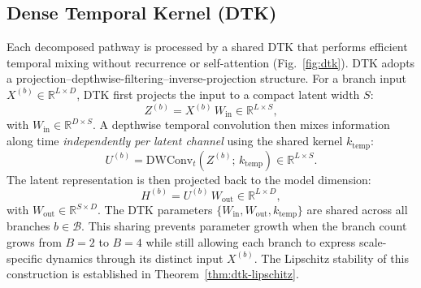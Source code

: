 \documentclass[journal]{IEEEtran}
\theoremstyle{remark}
\begin{document}
\subsection{Dense Temporal Kernel (DTK)}
Each decomposed pathway is processed by a shared DTK that performs
efficient temporal mixing without recurrence or self-attention
(Fig.~\ref{fig:dtk}). DTK adopts a
projection--depthwise-filtering--inverse-projection structure. For a
branch input $X^{(b)} \in \mathbb{R}^{L \times D}$, DTK first
projects the input to a compact latent width $S$:
\begin{equation}
\label{eq:dtk-zin}
Z^{(b)} = X^{(b)}\, W_{\mathrm{in}} \in \mathbb{R}^{L \times S},
\end{equation}
with $W_{\mathrm{in}} \in \mathbb{R}^{D \times S}$. A depthwise
temporal convolution then mixes information along time
\emph{independently per latent channel} using the shared kernel
$k_{\mathrm{temp}}$:
\begin{equation}
\label{eq:dtk-dwconv}
U^{(b)} = \mathrm{DWConv}_t(Z^{(b)};\, k_{\mathrm{temp}})
       \in \mathbb{R}^{L \times S}.
\end{equation}
The latent representation is then projected back to the model
dimension:
\begin{equation}
\label{eq:dtk-hout}
H^{(b)} = U^{(b)}\, W_{\mathrm{out}} \in \mathbb{R}^{L \times D},
\end{equation}
with $W_{\mathrm{out}} \in \mathbb{R}^{S \times D}$. The DTK
parameters $\{W_{\mathrm{in}}, W_{\mathrm{out}}, k_{\mathrm{temp}}\}$
are shared across all branches $b \in \mathcal{B}$. This sharing
prevents parameter growth when the branch count grows from $B{=}2$
to $B{=}4$ while still allowing each branch to express
scale-specific dynamics through its distinct input $X^{(b)}$. The
Lipschitz stability of this construction is established in
Theorem~\ref{thm:dtk-lipschitz}.
\end{document}

